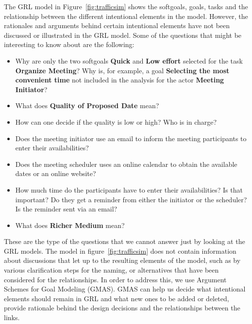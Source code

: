 The GRL model in Figure~\ref{fig:trafficsim} shows the softgoals, goals, tasks and the relationship between the different intentional elements in the model. However, the rationales and arguments behind certain intentional elements have not been discussed or illustrated in the GRL model. Some of the questions that might be interesting to know about are the following:

\begin{itemize}
	\item Why are only the two softgoals \textbf{Quick} and \textbf{Low effort} selected for the task \textbf{Organize Meeting}? Why is, for example, a goal \textbf{Selecting the most convenient time} not included in the analysis for the actor \textbf{Meeting Initiator}?
	\item What does \textbf{Quality of Proposed Date} mean?
	\item How can one decide if the quality is low or high? Who is in charge? 
	\item Does the meeting initiator use an email to inform the meeting participants to enter their availabilities? 
	\item Does the meeting scheduler uses an online calendar to obtain the available dates or an online website?
	\item How much time do the participants have to enter their availabilities? Is that important? Do they get a reminder from either the initiator or the scheduler? Is the reminder sent via an email? 
	\item What does \textbf{Richer Medium} mean? 
\end{itemize}

These are the type of the questions that we cannot answer just by looking at the GRL models. The model in figure~\ref{fig:trafficsim} does not contain information about discussions that let up to the resulting elements of the model, such as by various clarification steps for the naming, or alternatives that have been considered for the relationships. In order to address this, we use Argument Schemes for Goal Modeling (GMAS). GMAS can help us decide what intentional elements should remain in GRL and what new ones to be added or deleted, provide rationale behind the design decisions and the relationships between the links. 

